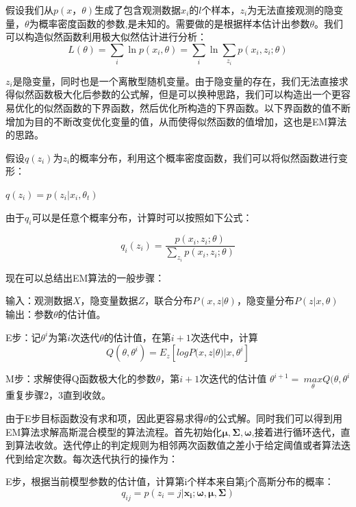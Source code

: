 \documentclass[a4paper,12pt,openany,oneside,utf-8]{ctexbook}
\begin{document}
    假设我们从$p(x，\theta)$生成了包含观测数据$x_i$的$l$个样本，$z_i$为无法直接观测的隐变量，$\theta$为概率密度函数的参数,是未知的。需要做的是根据样本估计出参数$\theta$。我们可以构造似然函数利用极大似然估计进行分析：
    \begin{equation}
        L(\theta)=\sum_i \ln p(x_i,\theta)=\sum_i \ln\sum_{z_i}p(x_i,z_i;\theta)
    \end{equation}
    
    $z_i$是隐变量，同时也是一个离散型随机变量。由于隐变量的存在，我们无法直接求得似然函数极大化后参数的公式解，但是可以换种思路，我们可以构造出一个更容易优化的似然函数的下界函数，然后优化所构造的下界函数。以下界函数的值不断增加为目的不断改变优化变量的值，从而使得似然函数的值增加，这也是EM算法的思路。
    
    假设$q(z_i)$为$z_i$的概率分布，利用这个概率密度函数，我们可以将似然函数进行变形：
    
    \begin{center}
    $q(z_i)=p(z_i|x_i,\theta_t)$
    \end{center}
    由于$q_i$可以是任意个概率分布，计算时可以按照如下公式：
    
    \begin{equation}
        q_i(z_i)=\frac{p(x_i,z_i;\theta)}{\sum_{z_i}p(x_i,z_i;\theta)}
    \end{equation}
    
    现在可以总结出EM算法的一般步骤：
    
    输入：观测数据$X$，隐变量数据$Z$，联合分布$P(x,z|\theta)$，隐变量分布$P(z|x,\theta)$
    输出：参数$\theta$的估计值。
    
    E步：记$\theta^i$为第$i$次迭代$\theta$的估计值，在第$i+1$次迭代中，计算
    \begin{equation}
      Q(\theta,\theta^{i})=E_z[logP(x,z|\theta)|x,\theta^{i}] 
    \end{equation}
    
	M步：求解使得Q函数极大化的参数$\theta$，第$i+1$次迭代的估计值
    $\theta^{i+1} = \ \underset{\theta}{max} Q(\theta,\theta^{i}$
	重复步骤2，3直到收敛。
	
	由于E步目标函数没有求和项，因此更容易求得$\theta$的公式解。同时我们可以得到用EM算法求解高斯混合模型的算法流程。首先初始化$\boldsymbol{\mu,\Sigma,\omega}$,接着进行循环迭代，直到算法收敛。迭代停止的判定规则为相邻两次函数值之差小于给定阈值或者算法迭代到给定次数。每次迭代执行的操作为：
	
	E步，根据当前模型参数的估计值，计算第i个样本来自第j个高斯分布的概率：
	\begin{equation}
	    q_{ij}=p(z_i=j|\boldsymbol{x_i;\omega,\mu,\Sigma})
	\end{equation}
    
\end{document}
